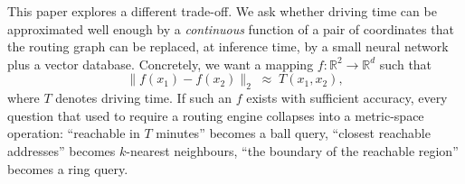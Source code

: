 \documentclass[11pt,a4paper]{article}
\begin{document}
This paper explores a different trade-off. We ask whether driving time
can be approximated well enough by a \emph{continuous} function of a
pair of coordinates that the routing graph can be replaced, at
inference time, by a small neural network plus a vector database.
Concretely, we want a mapping $f : \mathbb{R}^2 \to \mathbb{R}^d$ such
that
\begin{equation}
  \bigl\lVert f(x_1) - f(x_2) \bigr\rVert_2 \;\approx\; T(x_1, x_2),
  \label{eq:core}
\end{equation}
where $T$ denotes driving time. If such an $f$ exists with sufficient
accuracy, every question that used to require a routing engine
collapses into a metric-space operation: ``reachable in $T$ minutes''
becomes a ball query, ``closest reachable addresses'' becomes
$k$-nearest neighbours, ``the boundary of the reachable region''
becomes a ring query.
\end{document}
